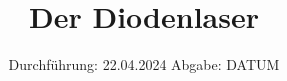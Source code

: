 

\subject{VERSUCH NUMMER 60}
\title{Der Diodenlaser}
\date{
  Durchführung: 22.04.2024
  \hspace{3em}
  Abgabe: DATUM
}



\maketitle
\thispagestyle{empty}
\tableofcontents
\newpage
\setcounter{page}{1}


%




\newpage
\printbibliography
\nocite{ap60}
\nocite{ap60.2}
\nocite{matplotlib}
\nocite{numpy}
\nocite{scipy}
\nocite{uncertainties}
\nocite{reback2020pandas}
\nocite{coherent}

\newpage
%
%


